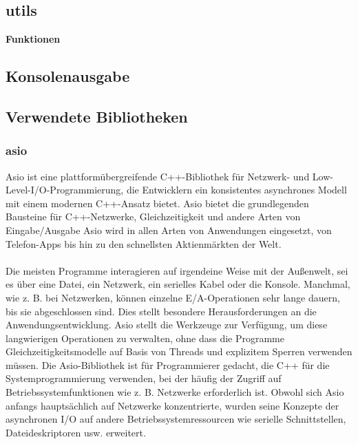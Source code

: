 \documentclass[a4paper,12pt]{article}
\begin{document}
\subsection{utils}
\textbf{Funktionen}\\
\subsection{Konsolenausgabe}
\newpage
\noindent
\subsection{Verwendete Bibliotheken}
\subsubsection{asio}
Asio ist eine plattformübergreifende C++-Bibliothek für Netzwerk- und Low-Level-I/O-Programmierung, die Entwicklern ein konsistentes asynchrones Modell mit einem modernen C++-Ansatz bietet.
Asio bietet die grundlegenden Bausteine für C++-Netzwerke, Gleichzeitigkeit und andere Arten von Eingabe/Ausgabe
Asio wird in allen Arten von Anwendungen eingesetzt, von Telefon-Apps bis hin zu den schnellsten Aktienmärkten der Welt.\\\\
Die meisten Programme interagieren auf irgendeine Weise mit der Außenwelt, sei es über eine Datei, ein Netzwerk, ein serielles Kabel oder die Konsole. Manchmal, wie z. B. bei Netzwerken, können einzelne E/A-Operationen sehr lange dauern, bis sie abgeschlossen sind. Dies stellt besondere Herausforderungen an die Anwendungsentwicklung.
Asio stellt die Werkzeuge zur Verfügung, um diese langwierigen Operationen zu verwalten, ohne dass die Programme Gleichzeitigkeitsmodelle auf Basis von Threads und explizitem Sperren verwenden müssen.
Die Asio-Bibliothek ist für Programmierer gedacht, die C++ für die Systemprogrammierung verwenden, bei der häufig der Zugriff auf Betriebssystemfunktionen wie z. B. Netzwerke erforderlich ist. Obwohl sich Asio anfangs hauptsächlich auf Netzwerke konzentrierte, wurden seine Konzepte der asynchronen I/O auf andere Betriebssystemressourcen wie serielle Schnittstellen, Dateideskriptoren usw. erweitert.
\cite{asio}
\end{document}
